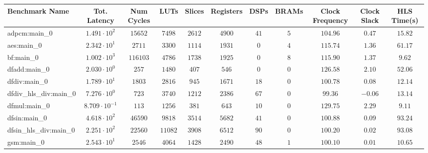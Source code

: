 \begin{tabular}{|l|c|c|c|c|c|c|c|c|c|c|}
\hline
Benchmark Name          & Tot. Latency            & Num Cycles & LUTs      & Slices    & Registers & DSPs    & BRAMs  & Clock Frequency & Clock Slack & HLS Time(s) \\
\hline
adpcm:main\_0           & $ 1.491 \cdot 10^{2}  $ & $ 15652  $ & $ 7498  $ & $ 2612  $ & $ 4900  $ & $ 41  $ & $ 5  $ & $ 104.96      $ & $ 0.47    $ & $ 15.82   $ \\
aes:main\_0             & $ 2.342 \cdot 10^{1}  $ & $ 2711   $ & $ 3300  $ & $ 1114  $ & $ 1931  $ & $ 0   $ & $ 4  $ & $ 115.74      $ & $ 1.36    $ & $ 61.17   $ \\
bf:main\_0              & $ 1.002 \cdot 10^{3}  $ & $ 116103 $ & $ 4786  $ & $ 1738  $ & $ 1925  $ & $ 0   $ & $ 8  $ & $ 115.90      $ & $ 1.37    $ & $ 9.62    $ \\
dfadd:main\_0           & $ 2.030 \cdot 10^{0}  $ & $ 257    $ & $ 1480  $ & $ 407   $ & $ 546   $ & $ 0   $ & $ 0  $ & $ 126.58      $ & $ 2.10    $ & $ 52.06   $ \\
dfdiv:main\_0           & $ 1.789 \cdot 10^{1}  $ & $ 1803   $ & $ 2816  $ & $ 945   $ & $ 1671  $ & $ 18  $ & $ 0  $ & $ 100.78      $ & $ 0.08    $ & $ 12.14   $ \\
dfdiv\_hls\_div:main\_0 & $ 7.276 \cdot 10^{0}  $ & $ 723    $ & $ 3740  $ & $ 1212  $ & $ 2386  $ & $ 67  $ & $ 0  $ & $ 99.36       $ & $ -0.06   $ & $ 13.14   $ \\
dfmul:main\_0           & $ 8.709 \cdot 10^{-1} $ & $ 113    $ & $ 1256  $ & $ 381   $ & $ 643   $ & $ 10  $ & $ 0  $ & $ 129.75      $ & $ 2.29    $ & $ 9.11    $ \\
dfsin:main\_0           & $ 4.618 \cdot 10^{2}  $ & $ 46590  $ & $ 9818  $ & $ 3514  $ & $ 5682  $ & $ 41  $ & $ 0  $ & $ 100.88      $ & $ 0.09    $ & $ 93.24   $ \\
dfsin\_hls\_div:main\_0 & $ 2.251 \cdot 10^{2}  $ & $ 22560  $ & $ 11082 $ & $ 3908  $ & $ 6512  $ & $ 90  $ & $ 0  $ & $ 100.20      $ & $ 0.02    $ & $ 93.08   $ \\
gsm:main\_0             & $ 2.543 \cdot 10^{1}  $ & $ 2546   $ & $ 4064  $ & $ 1428  $ & $ 2490  $ & $ 48  $ & $ 1  $ & $ 100.10      $ & $ 0.01    $ & $ 10.65   $ \\

\end{tabular}
